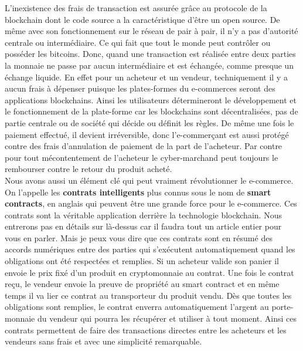 \documentclass[12pt]{report}
\begin{document}
\hspace{1cm} L'inexistence des frais de transaction est assurée grâce au protocole de la blockchain dont le code source a la caractéristique d'être un open source. De même avec son fonctionnement sur le réseau de pair à pair, il n'y a pas d'autorité centrale ou intermédiaire. Ce qui fait que tout le monde peut contrôler ou posséder les bitcoins. Donc, quand une transaction est réalisée entre deux parties la monnaie ne passe par aucun intermédiaire et est échangée, comme presque un échange liquide. En effet pour un acheteur et un vendeur, techniquement il y a aucun frais à dépenser puisque les plates-formes du e-commerces seront des applications blockchains. Ainsi les utilisateurs détermineront le développement et le fonctionnement de la plate-forme car les blockchains sont décentralisées, pas de partie centrale ou de société qui décide ou définit les règles. De même une fois le paiement effectué, il devient irréversible, donc l'e-commerçant est aussi protégé contre des frais d'annulation de paiement de la part de l'acheteur. Par contre pour tout mécontentement de l'acheteur le cyber-marchand  peut toujours le rembourser contre le retour du produit acheté.\\

\hspace{1cm} \hspace{1cm} Nous avons aussi un élément clé qui peut vraiment révolutionner le e-commerce. On l'appelle les \textbf{ contrats intelligents} plus connus sous le nom de \textbf{smart contracts}, en anglais qui peuvent être une grande force pour le e-commerce. Ces contrats sont la véritable application derrière la technologie blockchain. Nous entrerons pas en détails sur là-dessus car il faudra tout un article entier pour vous en parler. Mais je peux vous dire que ces contrats sont en résumé des accords numériques entre des parties qui s'exécutent automatiquement quand les obligations ont été respectées et remplies. Si un acheteur valide son panier il envoie le prix fixé d'un produit en cryptomonnaie au contrat. Une fois le contrat reçu, le vendeur envoie la preuve de propriété  au smart contract et en même temps il va lier ce contrat au transporteur du produit vendu. Dès que toutes les obligations sont remplies, le contrat enverra automatiquement l'argent au porte-monnaie du vendeur qui pourra les récupérer et utiliser à tout moment. Ainsi ces contrats permettent de faire des transactions directes entre les acheteurs et les vendeurs sans frais et avec une simplicité remarquable.\\
    
\end{document}
